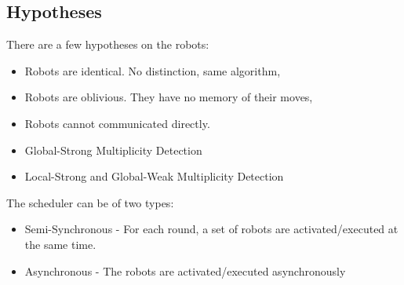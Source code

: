 \documentclass{beamer}
\begin{document}
\subsection{Hypotheses}
\begin{frame}
	There are a few hypotheses on the robots:
	\begin{itemize}
		\item<2-> Robots are identical. No distinction, same algorithm,
		\item<3-> Robots are oblivious. They have no memory of their moves,
		\item<4-> Robots cannot communicated directly.
	\end{itemize}
	
	\begin{itemize}
		\item<6-> Global-Strong Multiplicity Detection
		\item<7-> Local-Strong and Global-Weak Multiplicity Detection
	\end{itemize}
\end{frame}
\begin{frame}
	The scheduler can be of two types:
	\begin{itemize}
		\item<2->[SSYNC] Semi-Synchronous - For each round, a set of robots are activated/executed at the same time.
		\item<3->[ASYNC] Asynchronous - The robots are activated/executed asynchronously
	\end{itemize}
\end{frame}
\end{document}
